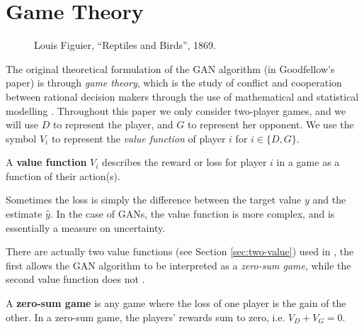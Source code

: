 \section{Game Theory}
\label{sec:game-theory}

\vspace{1cm}

\begin{figure}[h]
  \label{fig:paradise}
  \centering
  \caption{Louis Figuier, ``Reptiles and Birds'', 1869.}
\end{figure}

\vspace{1cm}

\noindent The original theoretical formulation of the GAN algorithm (in
Goodfellow's paper) is through \textit{game theory}, which is the
study of conflict and cooperation between rational decision makers
through the use of mathematical and statistical modelling
\cite{ref:myerson}.  Throughout this paper we only consider two-player
games, and we will use $D$ to represent the player, and $G$ to
represent her opponent. We use the symbol $V_i$ to represent the
\textit{value function} of player $i$ for $i \in \{D, G\}$.

\begin{definition}
  \label{def:value-function} A \textbf{value function} $V_i$ describes
  the reward or loss for player $i$ in a game as a function of their
  action(s).
\end{definition}

\begin{remark} Sometimes the loss is simply the difference between the
  target value $y$ and the estimate $\hat{y}$. In the case of GANs,
  the value function is more complex, and is essentially a measure on
  uncertainty.
\end{remark}

There are actually two value functions (see Section
\ref{sec:two-value}) used in \cite{ref:goodfellow-original}, the first
allows the GAN algorithm to be interpreted as a \textit{zero-sum
  game}, while the second value function does not
\cite{ref:gidel-variational-2018}.

\begin{definition}
  \label{def:zero-sum-game} A \textbf{zero-sum game} is any game where
  the loss of one player is the gain of the other. In a zero-sum game,
  the players' rewards sum to zero, i.e. $V_D + V_G = 0$.
\end{definition}

